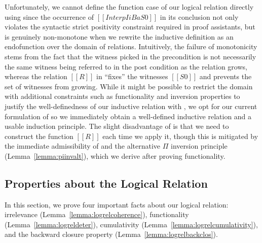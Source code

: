 \documentclass[acmsmall,screen=true,
\ifpublic review=false\else,review=true\fi
  ,anonymous=\ifanonymous true\else false\fi]{acmart}
\begin{document}
Unfortunately, we cannot define the function case of our logical
relation directly using  since the occurrence of
$[[Interp I i B {a} S0]]$ in its conclusion not only violates the
syntactic strict positivity constraint required in proof assistants,
but is genuinely non-monotone when we rewrite the inductive definition
as an endofunction over the domain of relations.
Intuitively, the failure of monotonicity stems from the fact
that the witness picked in the precondition is not necessarily the
same witness being referred to in the post condition as the relation
grows, whereas the
relation $[[R]]$ in  ``fixes'' the witnesses $[[S0]]$ and
prevents the set of witnesses from growing. While it might
be possible to restrict the domain with additional constraints such as
functionality and inversion properties to justify the well-definedness of our
inductive relation with , we opt for our current
formulation of  so we immediately obtain a
well-defined inductive relation and a usable induction principle. The
slight disadvantage of  is that we need to construct the
function $[[R]]$ each time we apply it, though this is mitigated by
the immediate admissibility of  and the alternative $\Pi$ inversion
principle (Lemma~\ref{lemma:piinvalt}), which we derive after proving functionality.


\subsection{Properties about the Logical Relation}
In this section, we prove four important facts about
our logical relation: irrelevance (Lemma~\ref{lemma:logrelcoherence}),
functionality (Lemma~\ref{lemma:logreldeter}), cumulativity
(Lemma~\ref{lemma:logrelcumulativity}), and the backward closure
property (Lemma~\ref{lemma:logrelbackclos}).
\end{document}
